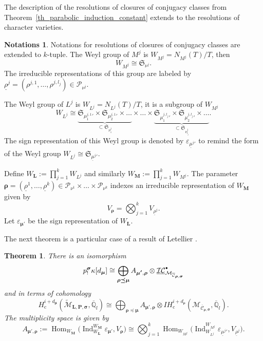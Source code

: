 \documentclass[11pt]{article}
\newcommand{\sbullet}{{\scriptscriptstyle\bullet}}
\newcommand{\csbullet}{{\raisebox{1pt}{$\sbullet$}}}
\newcommand{\rc}{\mathrm{c}}
\let\epsilon\varepsilon
\theoremstyle{definition}
\newtheorem{notations}[definition]{Notations}
\theoremstyle{plain}
\newtheorem{theorem}[definition]{Theorem}
\DeclareMathOperator{\Hom}{Hom}
\DeclareMathOperator{\Ind}{Ind}
\newcommand{\qlbar}{\overline{\mathbb{Q}}_l}
\newcommand{\IH}{\mathit{IH}}
\newcommand{\Sym}{\mathfrak{S}}
\newcommand{\Part}{\mathcal{P}}
\newcommand{\uic}[1]{\underline{\mathcal{I C}}_{#1}^{\csbullet}}
\newcommand{\mlps}{\widetilde{\mathcal{M}}_{\boldsymbol{L},\boldsymbol{P},\boldsymbol{\sigma}}}
\begin{document}
The description of the resolutions of closures of conjugacy classes from Theorem~\ref{th_parabolic_induction_constant} extends to the resolutions of character varieties.
\begin{notations}
Notations for resolutions of closures of conjugacy classes are extended to $k$-tuple.
The Weyl group of $M^j$ is $W_{M^j}=N_{M^j}(T)/T$, then
\[
W_{M^j}\cong \Sym_{\nu^j}.
\]
The irreducible representations of this group are labeled by $\underline{\rho}^j=(\rho^{j,1},\dots,\rho^{j,l_j})\!\in\! \Part_{\nu^j}$.

The Weyl group of $L^j$ is $W_{L^j}=N_{L^j}(T)/T$, it is a subgroup of $W_{M^j}$
\[
W_{L^j} \cong \underbrace{\Sym_{{\mu^{j,1}_1}'}\times \Sym_{{\mu^{j,1}_2}'} \times \dots }_{\subset \Sym_{\nu^j_1}}\times \dots \times \underbrace{\Sym_{{\mu^{j,l_j}_1}'}\times \Sym_{{\mu^{j,l_j}_2}'} \times \dots}_{\subset \Sym_{\nu^j_{l_j}}}.
\]
The sign representation of this Weyl group is denoted by $\epsilon_{{\underline{\mu}^j}'}$ to remind the form of the Weyl group $W_{L^j}\cong \Sym_{{\underline{\mu}^j}'}$.

Define $W_{\boldsymbol{L}} := \prod_{j=1}^k W_{L^j} $ and similarly $W_{\boldsymbol{M}}:= \prod_{j=1}^k W_{M^j}$.
The parameter $\boldsymbol{\rho}=(\underline{\rho}^1,\dots,\underline{\rho}^k)\in \Part_{\nu^1}\times \dots \times \Part_{\nu^k}$ indexes an irreducible representation of $W_{\boldsymbol{M}}$ given by
\[
V_{\boldsymbol{\rho}}=\bigotimes_{j=1}^k V_{\underline{\rho}^j}.
\]
Let $\epsilon_{\boldsymbol{\mu'}}$ be the sign representation of $W_{\boldsymbol{L}}$.
\end{notations}

The next theorem is a particular case of a result of Letellier \cite[Th.\,5.4]{Letellier13}.
\begin{theorem}\label{th_coho_resol_char}
There is an isomorphism
\[
p^{\boldsymbol{\sigma}}_! \kappa [d_{\boldsymbol{\mu}}] \cong \bigoplus_{\boldsymbol{\rho\preceq \mu}} A_{\boldsymbol{\mu'},\boldsymbol{\rho}}\otimes \uic{\mathcal{M}_{\overline{\mathcal{C}}_{\boldsymbol{\rho},\boldsymbol{\sigma}}}}
\]
and in terms of cohomology
\begin{equation}\label{eq_cohomology_resol}
H^{i+d_{\boldsymbol{\mu}}}_\rc
(\mlps,\qlbar)
\cong
\bigoplus_{\boldsymbol{\rho\preceq \mu}}
A_{\boldsymbol{\mu'},\boldsymbol{\rho}}\otimes
\IH_{\rc}^{i+d_{\boldsymbol{\rho}}}(\mathcal{M}_{\overline{\mathcal{C}}_{\boldsymbol{\rho},\boldsymbol{\sigma}}},\qlbar).
\end{equation}
The multiplicity space is given by
\[
A_{\boldsymbol{\mu'},\boldsymbol{\rho}}:= \Hom_{W_{\boldsymbol{M}}}\bigl(\Ind_{W_{\boldsymbol{L}}}^{W_{\boldsymbol{M}}}\epsilon_{\boldsymbol{\mu'}}, V_{\boldsymbol{\rho}}\bigr) \cong \bigotimes_{j=1}^k \Hom_{W_{M^j}}\bigl(\Ind_{W_{L^j}}^{W_{M^j}} \epsilon_{{\underline{\mu}^j}'}, V_{\underline{\rho}^j}\bigr).
\]
\end{theorem}
\end{document}
